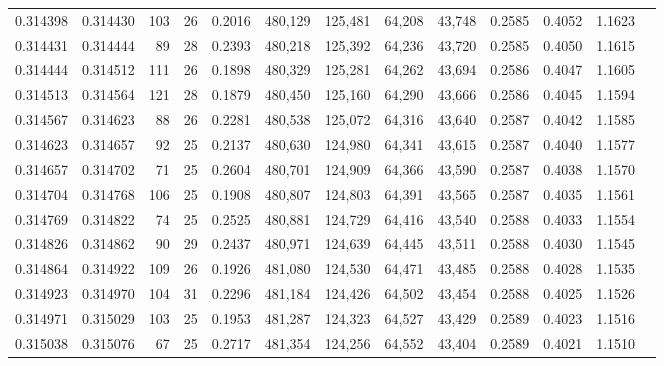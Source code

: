 \begin{tabular}{rrrrrrrrrrrrr}
0.314398 & 0.314430 &   103 &  26 &                                     0.2016 & 480,129 & 125,481 &  64,208 &  43,748 & 0.2585 & 0.4052 & 1.1623 \\
0.314431 & 0.314444 &    89 &  28 &                                     0.2393 & 480,218 & 125,392 &  64,236 &  43,720 & 0.2585 & 0.4050 & 1.1615 \\
0.314444 & 0.314512 &   111 &  26 &                                     0.1898 & 480,329 & 125,281 &  64,262 &  43,694 & 0.2586 & 0.4047 & 1.1605 \\
0.314513 & 0.314564 &   121 &  28 &                                     0.1879 & 480,450 & 125,160 &  64,290 &  43,666 & 0.2586 & 0.4045 & 1.1594 \\
0.314567 & 0.314623 &    88 &  26 &                                     0.2281 & 480,538 & 125,072 &  64,316 &  43,640 & 0.2587 & 0.4042 & 1.1585 \\
0.314623 & 0.314657 &    92 &  25 &                                     0.2137 & 480,630 & 124,980 &  64,341 &  43,615 & 0.2587 & 0.4040 & 1.1577 \\
0.314657 & 0.314702 &    71 &  25 &                                     0.2604 & 480,701 & 124,909 &  64,366 &  43,590 & 0.2587 & 0.4038 & 1.1570 \\
0.314704 & 0.314768 &   106 &  25 &                                     0.1908 & 480,807 & 124,803 &  64,391 &  43,565 & 0.2587 & 0.4035 & 1.1561 \\
0.314769 & 0.314822 &    74 &  25 &                                     0.2525 & 480,881 & 124,729 &  64,416 &  43,540 & 0.2588 & 0.4033 & 1.1554 \\
0.314826 & 0.314862 &    90 &  29 &                                     0.2437 & 480,971 & 124,639 &  64,445 &  43,511 & 0.2588 & 0.4030 & 1.1545 \\
0.314864 & 0.314922 &   109 &  26 &                                     0.1926 & 481,080 & 124,530 &  64,471 &  43,485 & 0.2588 & 0.4028 & 1.1535 \\
0.314923 & 0.314970 &   104 &  31 &                                     0.2296 & 481,184 & 124,426 &  64,502 &  43,454 & 0.2588 & 0.4025 & 1.1526 \\
0.314971 & 0.315029 &   103 &  25 &                                     0.1953 & 481,287 & 124,323 &  64,527 &  43,429 & 0.2589 & 0.4023 & 1.1516 \\
0.315038 & 0.315076 &    67 &  25 &                                     0.2717 & 481,354 & 124,256 &  64,552 &  43,404 & 0.2589 & 0.4021 & 1.1510 \\

\end{tabular}
